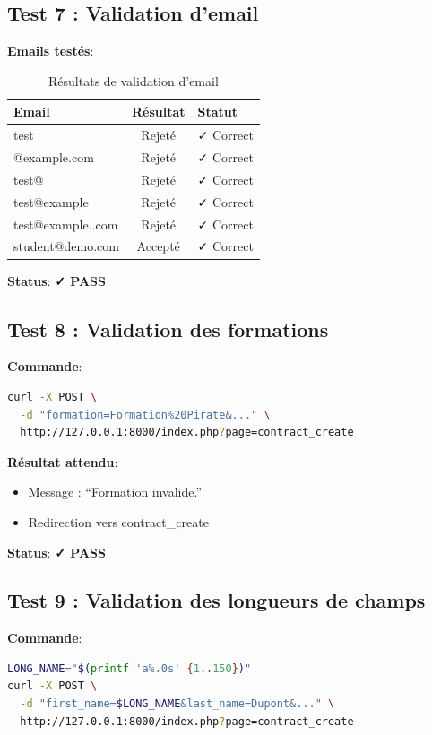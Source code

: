 \documentclass[11pt,a4paper,french]{report}
\newcommand{\pass}{\cellcolor{pass}\textbf{\color{white}✓ PASS}}
\begin{document}
\subsection{Test 7 : Validation d'email}

\textbf{Emails testés}:
\begin{table}[H]
\centering
\caption{Résultats de validation d'email}
\begin{tabular}{|l|c|l|}
\hline
\textbf{Email} & \textbf{Résultat} & \textbf{Statut} \\
\hline
test & Rejeté & ✓ Correct \\
\hline
@example.com & Rejeté & ✓ Correct \\
\hline
test@ & Rejeté & ✓ Correct \\
\hline
test@example & Rejeté & ✓ Correct \\
\hline
test@example..com & Rejeté & ✓ Correct \\
\hline
student@demo.com & Accepté & ✓ Correct \\
\hline
\end{tabular}
\end{table}

\textbf{Status}: \pass

\subsection{Test 8 : Validation des formations}

\textbf{Commande}:
\begin{lstlisting}[language=bash]
curl -X POST \
  -d "formation=Formation%20Pirate&..." \
  http://127.0.0.1:8000/index.php?page=contract_create
\end{lstlisting}

\textbf{Résultat attendu}:
\begin{itemize}
    \item Message : ``Formation invalide.''
    \item Redirection vers contract\_create
\end{itemize}

\textbf{Status}: \pass

\subsection{Test 9 : Validation des longueurs de champs}

\textbf{Commande}:
\begin{lstlisting}[language=bash]
LONG_NAME="$(printf 'a%.0s' {1..150})"
curl -X POST \
  -d "first_name=$LONG_NAME&last_name=Dupont&..." \
  http://127.0.0.1:8000/index.php?page=contract_create
\end{lstlisting}
\end{document}
